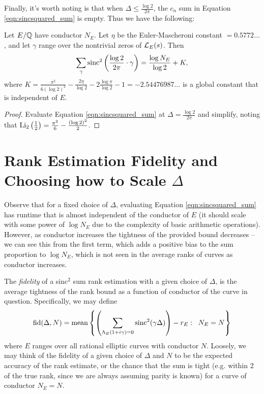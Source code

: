 Finally, it's worth noting is that when $\Delta \le \frac{\log 2}{2\pi}$, the $c_n$ sum in Equation \ref{eqn:sincsquared_sum} is empty. Thus we have the following:
\begin{corollary}[GRH]
Let $E/\mathbb{Q}$ have conductor $N_E$. Let $\eta$ be the Euler-Mascheroni constant $=0.5772\ldots$, and let $\gamma$ range over the nontrivial zeros of $\mathcal{L}_E(s)$. Then
\begin{equation}
\sum_{\gamma} \operatorname{sinc}^2\left(\frac{\log 2}{2\pi} \cdot \gamma \right) = \frac{\log N_E}{\log 2} + K,
\end{equation}
where $K = \frac{\pi^2}{6(\log 2)^2} - \frac{2\eta}{\log 2} - 2\frac{\log \pi}{\log 2} - 1 = -2.54476987\ldots$ is a global constant that is independent of $E$.
\end{corollary}
\begin{proof}
Evaluate Equation \ref{eqn:sincsquared_sum} at $\Delta = \frac{\log 2}{2\pi}$ and simplify, noting that $\operatorname{Li}_2\left(\frac{1}{2}\right) = \frac{\pi^2}{6} - \frac{(\log 2)^2}{2}$.
\end{proof}

\newpage
\section{Rank Estimation Fidelity and Choosing how to Scale $\Delta$}

Observe that for a fixed choice of $\Delta$, evaluating Equation \ref{eqn:sincsquared_sum} has runtime that is almost independent of the conductor of $E$ (it should scale with some power of $\log N_E$ due to the complexity of basic arithmetic operations). However, as conductor increases the tightness of the provided bound decreases -- we can see this from the first term, which adds a positive bias to the sum proportion to $\log N_E$, which is not seen in the average ranks of curves as conductor increases. \\

\begin{definition}
The {\it fidelity} of a sinc$^2$ sum rank estimation with a given choice of $\Delta$, is the average tightness of the rank bound as a function of conductor of the curve in question. Specifically, we may define
\begin{equation}
\mbox{fid}(\Delta,N) = \mbox{mean}\left\{\left(\sum_{\Lambda_E(1+i\gamma)=0}\operatorname{sinc}^2(\gamma \Delta)\right) - r_E:\;\; N_E = N\right\}
\end{equation}
where $E$ ranges over all rational elliptic curves with conductor $N$. Loosely, we may think of the fidelity of a given choice of $\Delta$ and $N$ to be the expected accuracy of the rank estimate, or the chance that the sum is tight (e.g. within 2 of the true rank, since we are always assuming parity is known) for a curve of conductor $N_E=N$. 
\end{definition}


